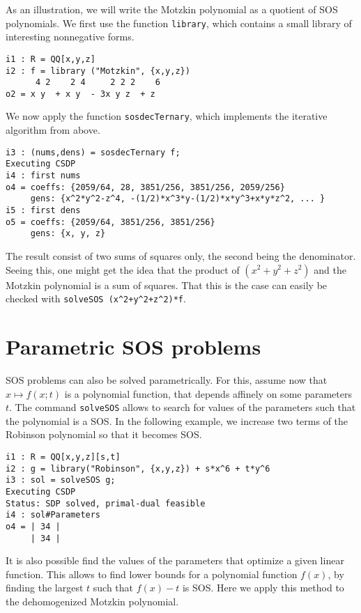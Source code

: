 \documentclass[11pt]{amsart}
\theoremstyle{plain}%
\theoremstyle{definition}
\theoremstyle{remark}
\begin{document}
As an illustration, we will write the Motzkin polynomial as a quotient of SOS polynomials.
We first use the function \verb|library|, which contains a small library of interesting nonnegative forms.
{\small
\begin{verbatim}
i1 : R = QQ[x,y,z]
i2 : f = library ("Motzkin", {x,y,z})
      4 2    2 4     2 2 2    6
o2 = x y  + x y  - 3x y z  + z
\end{verbatim}
}

\noindent
We now apply the function \verb|sosdecTernary|, which implements the iterative algorithm from above.
{\small
\begin{verbatim}
i3 : (nums,dens) = sosdecTernary f;
Executing CSDP
i4 : first nums
o4 = coeffs: {2059/64, 28, 3851/256, 3851/256, 2059/256}
     gens: {x^2*y^2-z^4, -(1/2)*x^3*y-(1/2)*x*y^3+x*y*z^2, ... }
i5 : first dens
o5 = coeffs: {2059/64, 3851/256, 3851/256}
     gens: {x, y, z}
\end{verbatim}
}

The result consist of two sums of squares only, the second being the denominator.
Seeing this, one might get the idea that the product of $(x^{2}+y^{2}+z^{2})$ and the Motzkin polynomial is a sum of squares.
That this is the case can easily be checked with \verb|solveSOS (x^2+y^2+z^2)*f|.

\section{Parametric SOS problems}

SOS problems can also be solved parametrically.
For this, assume now that $x \mapsto f(x;t)$ is a polynomial function, that depends affinely on some parameters~$t$.
The command \verb|solveSOS| allows to search for values of the parameters such that the polynomial is a SOS.
In the following example, we increase two terms of the Robinson polynomial so that it becomes SOS.

{\small
\begin{verbatim}
i1 : R = QQ[x,y,z][s,t]
i2 : g = library("Robinson", {x,y,z}) + s*x^6 + t*y^6
i3 : sol = solveSOS g;
Executing CSDP
Status: SDP solved, primal-dual feasible
i4 : sol#Parameters
o4 = | 34 |
     | 34 |
\end{verbatim}
}

It is also possible find the values of the parameters that optimize a given linear function.
This allows to find lower bounds for a polynomial function $f(x)$,
by finding the largest $t$ such that $f(x)-t$ is SOS.
Here we apply this method to the dehomogenized Motzkin polynomial.
\end{document}
